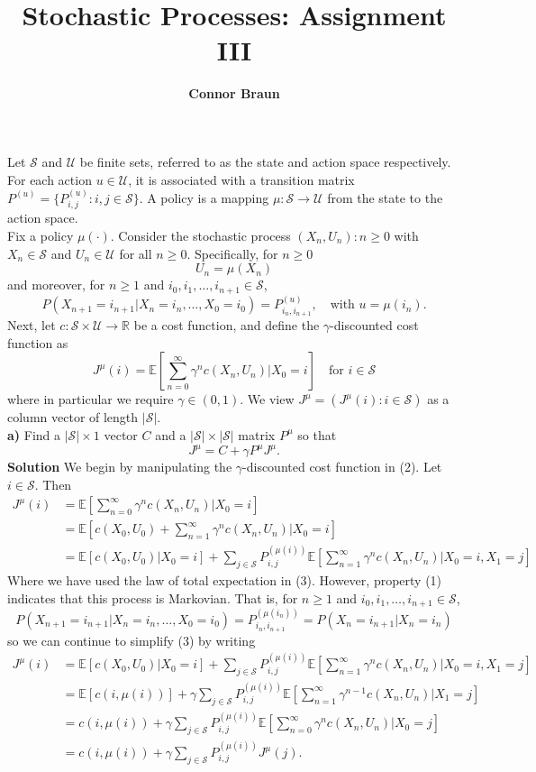 \documentclass[11pt, letterpaper]{article}
\title{\bf Stochastic Processes: Assignment III}
\author{\bf Connor Braun}
\date{}
\newcommand{\mbb}[1]{\mathbb{#1}}
\newcommand{\mc}[1]{\mathcal{#1}}
\begin{document}
 
    \maketitle
     Let $\mc{S}$ and $\mc{U}$ be finite sets, referred to as the state and action space respectively.
    For each action $u\in\mc{U}$, it is associated with a transition matrix $P^{(u)}=\{P_{i,j}^{(u)}:i,j\in\mc{S}\}$. A policy is a mapping
    $\mu:\mc{S}\rightarrow\mc{U}$ from the state to the action space.\\[10pt]
    Fix a policy $\mu(\cdot)$. Consider the stochastic process ${(X_n,U_n):n\geq 0}$ with $X_n\in\mc{S}$ and $U_n\in\mc{U}$ for all $n\geq 0$.
    Specifically, for $n\geq 0$
    \[U_n=\mu(X_n)\]
    and moreover, for $n\geq 1$ and $i_0,i_1,\dots,i_{n+1}\in\mc{S}$,
    \[P(X_{n+1}=i_{n+1}|X_n=i_n,\dots,X_0=i_0)=P^{(u)}_{i_n,i_{n+1}},\quad\text{with $u=\mu(i_n)$}.\tag{1}\]
    Next, let $c:\mc{S}\times\mc{U}\rightarrow\mbb{R}$ be a cost function, and define the $\gamma$-discounted cost function as
    \[J^\mu(i)=\mbb{E}\left[\sum_{n=0}^\infty\gamma^nc(X_n,U_n)\bigg|X_0=i\right]\quad\text{for $i\in\mc{S}$}\tag{2}\]
    where in particular we require $\gamma\in(0,1)$. We view $J^\mu=(J^\mu(i):i\in\mc{S})$ as a column vector of length $|\mc{S}|$.\\[10pt]
    {\bf a)} Find a $|\mc{S}|\times 1$ vector $C$ and a $|\mc{S}|\times|\mc{S}|$ matrix $P^\mu$ so that
    \[J^\mu=C+\gamma P^\mu J^\mu.\]
    {\bf Solution} We begin by manipulating the $\gamma$-discounted cost function in (2). Let $i\in \mc{S}$. Then
    \begin{align*}
        J^\mu(i)&=\mbb{E}\left[\sum_{n=0}^\infty\gamma^n c(X_n,U_n)\bigg|X_0=i\right]\\
        &=\mbb{E}\left[c(X_0,U_0)+\sum_{n=1}^\infty\gamma^n c(X_n,U_n)\bigg|X_0=i\right]\\
        &=\mbb{E}[c(X_0,U_0)|X_0=i]+\sum_{j\in \mc{S}}P_{i,j}^{(\mu(i))}\mbb{E}\left[\sum_{n=1}^\infty\gamma^n c(X_n,U_n)\bigg|X_0=i,X_1=j\right]\tag{3}
    \end{align*}
    Where we have used the law of total expectation in (3). However, property (1) indicates that this process is Markovian. That is, for $n\geq 1$ and $i_0,i_1,\dots,i_{n+1}\in\mc{S}$,
    \[P(X_{n+1}=i_{n+1}|X_n=i_n,\dots,X_0=i_0)=P^{(\mu(i_n))}_{i_n,i_{n+1}}=P(X_n=i_{n+1}|X_n=i_n)\]
    so we can continue to simplify (3) by writing
    \begin{align*}
        J^\mu(i)&=\mbb{E}[c(X_0,U_0)|X_0=i]+\sum_{j\in \mc{S}}P_{i,j}^{(\mu(i))}\mbb{E}\left[\sum_{n=1}^\infty\gamma^n c(X_n,U_n)\bigg|X_0=i,X_1=j\right]\\
        &=\mbb{E}[c(i,\mu(i))]+\gamma\sum_{j\in \mc{S}}P_{i,j}^{(\mu(i))}\mbb{E}\left[\sum_{n=1}^\infty\gamma^{n-1}c(X_n,U_n)\bigg|X_1=j\right]\\
        &=c(i,\mu(i))+\gamma\sum_{j\in \mc{S}}P_{i,j}^{(\mu(i))}\mbb{E}\left[\sum_{n=0}^\infty\gamma^{n}c(X_n,U_n)\bigg|X_0=j\right]\\
        &=c(i,\mu(i))+\gamma\sum_{j\in\mc{S}}P_{i,j}^{(\mu(i))}J^\mu(j).
    \end{align*}
\end{document}
